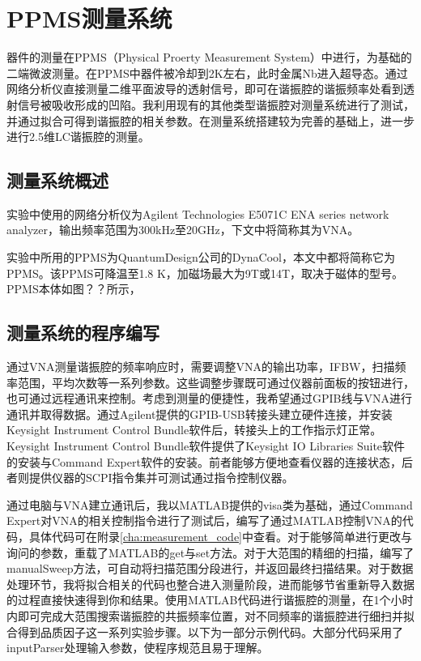 

        \chapter{PPMS测量系统} %
        \label{cha:PPMS测量系统}
            器件的测量在PPMS（Physical Proerty Measurement System）中进行，为基础的二端微波测量。在PPMS中器件被冷却到2K左右，此时金属Nb进入超导态。通过网络分析仪直接测量二维平面波导的透射信号，即可在谐振腔的谐振频率处看到透射信号被吸收形成的凹陷。我利用现有的其他类型谐振腔对测量系统进行了测试，并通过拟合可得到谐振腔的相关参数。在测量系统搭建较为完善的基础上，进一步进行2.5维LC谐振腔的测量。

            \section{测量系统概述} %
            \label{sec:测量系统概述}

            实验中使用的网络分析仪为Agilent Technologies E5071C ENA series network analyzer，输出频率范围为300kHz至20GHz，下文中将简称其为VNA。


            实验中所用的PPMS为QuantumDesign公司的DynaCool，本文中都将简称它为PPMS。该PPMS可降温至1.8 K，加磁场最大为9T或14T，取决于磁体的型号。PPMS本体如图？？所示，
                

            \section{测量系统的程序编写} %
            \label{sec:测量系统}
            通过VNA测量谐振腔的频率响应时，需要调整VNA的输出功率，IFBW，扫描频率范围，平均次数等一系列参数。这些调整步骤既可通过仪器前面板的按钮进行，也可通过远程通讯来控制。考虑到测量的便捷性，我希望通过GPIB线与VNA进行通讯并取得数据。通过Agilent提供的GPIB-USB转接头建立硬件连接，并安装Keysight Instrument Control Bundle软件后，转接头上的工作指示灯正常。Keysight Instrument Control Bundle软件提供了Keysight IO Libraries Suite软件的安装与Command Expert软件的安装。前者能够方便地查看仪器的连接状态，后者则提供仪器的SCPI指令集并可测试通过指令控制仪器。

            通过电脑与VNA建立通讯后，我以MATLAB提供的visa类为基础，通过Command Expert对VNA的相关控制指令进行了测试后，编写了通过MATLAB控制VNA的代码，具体代码可在附录\ref{cha:measurement_code}中查看。对于能够简单进行更改与询问的参数，重载了MATLAB的get与set方法。对于大范围的精细的扫描，编写了manualSweep方法，可自动将扫描范围分段进行，并返回最终扫描结果。对于数据处理环节，我将拟合相关的代码也整合进入测量阶段，进而能够节省重新导入数据的过程直接快速得到你和结果。使用MATLAB代码进行谐振腔的测量，在1个小时内即可完成大范围搜索谐振腔的共振频率位置，对不同频率的谐振腔进行细扫并拟合得到品质因子这一系列实验步骤。以下为一部分示例代码。大部分代码采用了inputParser处理输入参数，使程序规范且易于理解。

